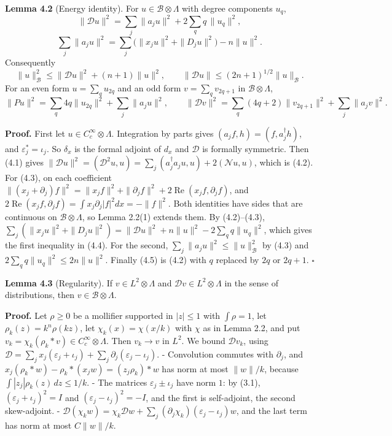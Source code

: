 \documentclass[
  11pt,
]{article}
\begin{document}
\textbf{Lemma 4.2} (Energy identity). For
\(u\in\mathcal B\otimes\Lambda\) with degree components \(u_q\), \[
\|\mathcal Du\|^2=\sum_j\|a_ju\|^2+2\sum_qq\,\|u_q\|^2,
\tag{4.2}
\] \[
\sum_j\|a_ju\|^2=\sum_j\bigl(\|x_ju\|^2+\|D_ju\|^2\bigr)-n\|u\|^2 .
\tag{4.3}
\] Consequently \[
\|u\|_{\mathcal B}^2\le\|\mathcal Du\|^2+(n+1)\|u\|^2,\qquad \|\mathcal Du\|\le(2n+1)^{1/2}\|u\|_{\mathcal B}.
\tag{4.4}
\] For an even form \(u=\sum_qu_{2q}\) and an odd form
\(v=\sum_qv_{2q+1}\) in \(\mathcal B\otimes\Lambda\), \[
\|Pu\|^2=\sum_q4q\|u_{2q}\|^2+\sum_j\|a_ju\|^2,\qquad
\|\mathcal Dv\|^2=\sum_q(4q+2)\|v_{2q+1}\|^2+\sum_j\|a_jv\|^2 .
\tag{4.5}
\]

\textbf{Proof.} First let \(u\in C_c^\infty\otimes\Lambda\). Integration
by parts gives \((a_jf,h)=(f,a_j^\dagger h)\), and
\(\varepsilon_j^*=\iota_j\). So \(\delta_x\) is the formal adjoint of
\(d_x\) and \(\mathcal D\) is formally symmetric. Then (4.1) gives
\(\|\mathcal Du\|^2=(\mathcal D^2u,u)=\sum_j(a_j^\dagger a_ju,u)+2(\mathcal Nu,u)\),
which is (4.2). For (4.3), on each coefficient
\(\|(x_j+\partial_j)f\|^2=\|x_jf\|^2+\|\partial_jf\|^2+2\operatorname{Re}(x_jf,\partial_jf)\),
and
\(2\operatorname{Re}(x_jf,\partial_jf)=\int x_j\partial_j|f|^2dx=-\|f\|^2\).
Both identities have sides that are continuous on
\(\mathcal B\otimes\Lambda\), so Lemma 2.2(1) extends them. By
(4.2)--(4.3),
\(\sum_j(\|x_ju\|^2+\|D_ju\|^2)=\|\mathcal Du\|^2+n\|u\|^2-2\sum_qq\|u_q\|^2\),
which gives the first inequality in (4.4). For the second,
\(\sum_j\|a_ju\|^2\le\|u\|^2_{\mathcal B}\) by (4.3) and
\(2\sum_qq\|u_q\|^2\le2n\|u\|^2\). Finally (4.5) is (4.2) with \(q\)
replaced by \(2q\) or \(2q+1\). \(\square\)

\textbf{Lemma 4.3} (Regularity). If \(v\in L^2\otimes\Lambda\) and
\(\mathcal Dv\in L^2\otimes\Lambda\) in the sense of distributions, then
\(v\in\mathcal B\otimes\Lambda\).

\textbf{Proof.} Let \(\rho\ge0\) be a mollifier supported in \(|z|\le1\)
with \(\int\rho=1\), let \(\rho_k(z)=k^n\rho(kz)\), let
\(\chi_k(x)=\chi(x/k)\) with \(\chi\) as in Lemma 2.2, and put
\(v_k=\chi_k(\rho_k*v)\in C_c^\infty\otimes\Lambda\). Then \(v_k\to v\)
in \(L^2\). We bound \(\mathcal Dv_k\), using
\(\mathcal D=\sum_jx_j(\varepsilon_j+\iota_j)+\sum_j\partial_j(\varepsilon_j-\iota_j)\).
- Convolution commutes with \(\partial_j\), and
\(x_j(\rho_k*w)-\rho_k*(x_jw)=(z_j\rho_k)*w\) has norm at most
\(\|w\|/k\), because \(\int|z_j|\rho_k(z)\,dz\le1/k\). - The matrices
\(\varepsilon_j\pm\iota_j\) have norm \(1\): by (3.1),
\((\varepsilon_j+\iota_j)^2=I\) and \((\varepsilon_j-\iota_j)^2=-I\),
and the first is self-adjoint, the second skew-adjoint. -
\(\mathcal D(\chi_kw)=\chi_k\mathcal Dw+\sum_j(\partial_j\chi_k)(\varepsilon_j-\iota_j)w\),
and the last term has norm at most \(C\|w\|/k\).
\end{document}
